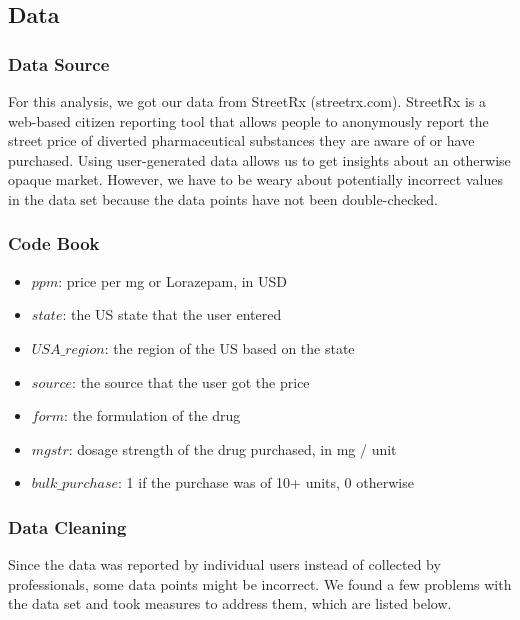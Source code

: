 \documentclass[
]{article}
\providecommand{\tightlist}{%
  \setlength{\itemsep}{0pt}\setlength{\parskip}{0pt}}
\begin{document}
\hypertarget{data}{%
\subsection{Data}\label{data}}

\hypertarget{data-source}{%
\subsubsection{Data Source}\label{data-source}}

For this analysis, we got our data from StreetRx (streetrx.com).
StreetRx is a web-based citizen reporting tool that allows people to
anonymously report the street price of diverted pharmaceutical
substances they are aware of or have purchased. Using user-generated
data allows us to get insights about an otherwise opaque market.
However, we have to be weary about potentially incorrect values in the
data set because the data points have not been double-checked.

\hypertarget{code-book}{%
\subsubsection{Code Book}\label{code-book}}

\begin{itemize}
\tightlist
\item
  \(ppm\): price per mg or Lorazepam, in USD
\item
  \(state\): the US state that the user entered
\item
  \(USA\_region\): the region of the US based on the state
\item
  \(source\): the source that the user got the price
\item
  \(form\): the formulation of the drug
\item
  \(mgstr\): dosage strength of the drug purchased, in mg / unit
\item
  \(bulk\_purchase\): 1 if the purchase was of 10+ units, 0 otherwise
\end{itemize}

\hypertarget{data-cleaning}{%
\subsubsection{Data Cleaning}\label{data-cleaning}}

Since the data was reported by individual users instead of collected by
professionals, some data points might be incorrect. We found a few
problems with the data set and took measures to address them, which are
listed below.
\end{document}
